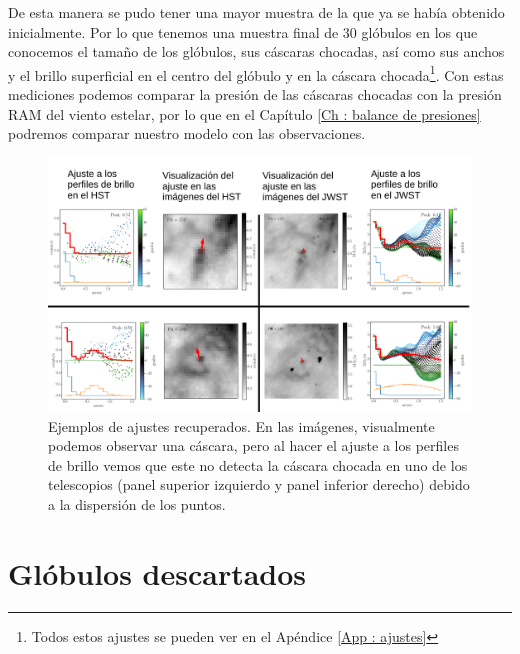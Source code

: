 \documentclass{book}
\begin{document}
De esta manera se pudo tener una mayor muestra de la que ya se había obtenido inicialmente. Por lo que tenemos una muestra final de 30 glóbulos en los que conocemos el tamaño de los glóbulos, sus cáscaras chocadas, así como  sus anchos y el brillo superficial en el centro del glóbulo y en la cáscara chocada\footnote{Todos estos ajustes se pueden ver en el Apéndice \ref{App : ajustes}}. Con estas mediciones podemos comparar la presión de las cáscaras chocadas con la presión RAM del viento estelar, por lo que en el Capítulo \ref{Ch : balance de presiones} podremos comparar nuestro modelo con las observaciones.

\begin{figure}[htb]
    \centering
    \includegraphics[width=\textwidth]{imagenes_corregidas/recuperados_aj.pdf}
    \caption{Ejemplos de ajustes recuperados. En las imágenes, visualmente podemos observar una cáscara, pero al hacer el ajuste a los perfiles de brillo vemos que este no detecta la cáscara chocada en uno de los telescopios (panel superior izquierdo y panel inferior derecho) debido a la dispersión de los puntos.}
    \label{Recuperados Globulos}
\end{figure}

\section{Glóbulos descartados}\label{Bad globules}
\end{document}
